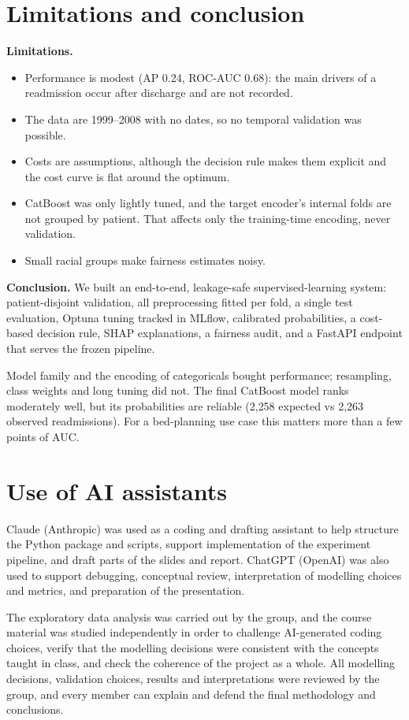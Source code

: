 \documentclass[11pt,a4paper]{article}
\begin{document}
\section{Limitations and conclusion}

\textbf{Limitations.}
\begin{itemize}
\item Performance is modest (AP 0.24, ROC-AUC 0.68): the main drivers of a readmission occur after discharge and are not recorded.
\item The data are 1999--2008 with no dates, so no temporal validation was possible.
\item Costs are assumptions, although the decision rule makes them explicit and the cost curve is flat around the optimum.
\item CatBoost was only lightly tuned, and the target encoder's internal folds are not grouped by patient. That affects only the training-time encoding, never validation.
\item Small racial groups make fairness estimates noisy.
\end{itemize}

\textbf{Conclusion.} We built an end-to-end, leakage-safe supervised-learning system: patient-disjoint validation, all preprocessing fitted per fold, a single test evaluation, Optuna tuning tracked in MLflow, calibrated probabilities, a cost-based decision rule, SHAP explanations, a fairness audit, and a FastAPI endpoint that serves the frozen pipeline.

Model family and the encoding of categoricals bought performance; resampling, class weights and long tuning did not. The final CatBoost model ranks moderately well, but its probabilities are reliable (2{,}258 expected vs 2{,}263 observed readmissions). For a bed-planning use case this matters more than a few points of AUC.

\section*{Use of AI assistants}
Claude (Anthropic) was used as a coding and drafting assistant to help structure the Python package and scripts, support implementation of the experiment pipeline, and draft parts of the slides and report. ChatGPT (OpenAI) was also used to support debugging, conceptual review, interpretation of modelling choices and metrics, and preparation of the presentation.

The exploratory data analysis was carried out by the group, and the course material was studied independently in order to challenge AI-generated coding choices, verify that the modelling decisions were consistent with the concepts taught in class, and check the coherence of the project as a whole. All modelling decisions, validation choices, results and interpretations were reviewed by the group, and every member can explain and defend the final methodology and conclusions.
\end{document}
